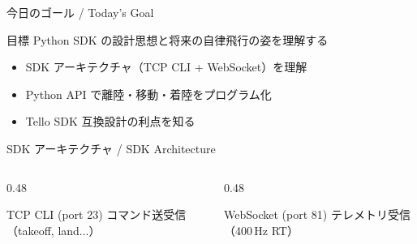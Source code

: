 \begin{frame}{今日のゴール / Today's Goal}
  \begin{block}{目標}
    Python SDK の設計思想と将来の自律飛行の姿を理解する
  \end{block}

  \vspace{1em}

  \begin{itemize}
    \item SDK アーキテクチャ（TCP CLI + WebSocket）を理解
    \item Python API で離陸・移動・着陸をプログラム化
    \item Tello SDK 互換設計の利点を知る
  \end{itemize}
\end{frame}

\begin{frame}{SDK アーキテクチャ / SDK Architecture}
  \centering
  \resizebox{0.85\linewidth}{!}{}

  \vspace{0.5em}

  \begin{columns}[c]
    \begin{column}{0.48\textwidth}
      \begin{block}{TCP CLI (port 23)}
        コマンド送受信（takeoff, land...）
      \end{block}
    \end{column}
    \begin{column}{0.48\textwidth}
      \begin{block}{WebSocket (port 81)}
        テレメトリ受信（400\,Hz RT）
      \end{block}
    \end{column}
  \end{columns}
\end{frame}

